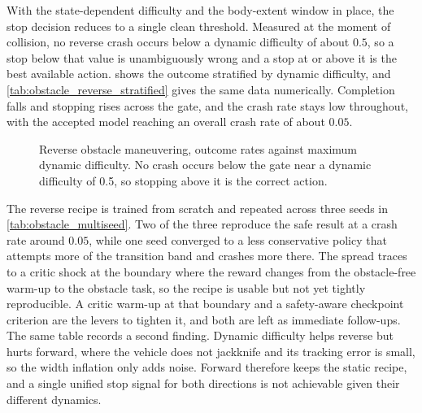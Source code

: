 

With the state-dependent difficulty and the body-extent window in place, the stop decision reduces to a single clean threshold. Measured at the moment of collision, no reverse crash occurs below a dynamic difficulty of about $0.5$, so a stop below that value is unambiguously wrong and a stop at or above it is the best available action.  shows the outcome stratified by dynamic difficulty, and \cref{tab:obstacle_reverse_stratified} gives the same data numerically. Completion falls and stopping rises across the gate, and the crash rate stays low throughout, with the accepted model reaching an overall crash rate of about $0.05$.

\begin{figure}[H]
    \centering
    \caption{Reverse obstacle maneuvering, outcome rates against maximum dynamic difficulty. No crash occurs below the gate near a dynamic difficulty of 0.5, so stopping above it is the correct action.}
    \label{fig:reverse_obstacle_gate}
\end{figure}



The reverse recipe is trained from scratch and repeated across three seeds in \cref{tab:obstacle_multiseed}. Two of the three reproduce the safe result at a crash rate around $0.05$, while one seed converged to a less conservative policy that attempts more of the transition band and crashes more there. The spread traces to a critic shock at the boundary where the reward changes from the obstacle-free warm-up to the obstacle task, so the recipe is usable but not yet tightly reproducible. A critic warm-up at that boundary and a safety-aware checkpoint criterion are the levers to tighten it, and both are left as immediate follow-ups. The same table records a second finding. Dynamic difficulty helps reverse but hurts forward, where the vehicle does not jackknife and its tracking error is small, so the width inflation only adds noise. Forward therefore keeps the static recipe, and a single unified stop signal for both directions is not achievable given their different dynamics.



